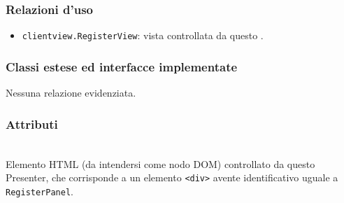 \subsubsection*{Relazioni d'uso}
\begin{itemize}
  \item \texttt{clientview.RegisterView}: vista controllata da questo .
\end{itemize}

\subsubsection*{Classi estese ed interfacce implementate}
Nessuna relazione evidenziata.

\subsubsection*{Attributi}
\begin{description}
  \item{}\\
  Elemento HTML (da intendersi come nodo DOM) controllato da questo Presenter, che corrisponde a un elemento \verb'<div>' avente identificativo uguale a \verb'RegisterPanel'.
\end{description}

